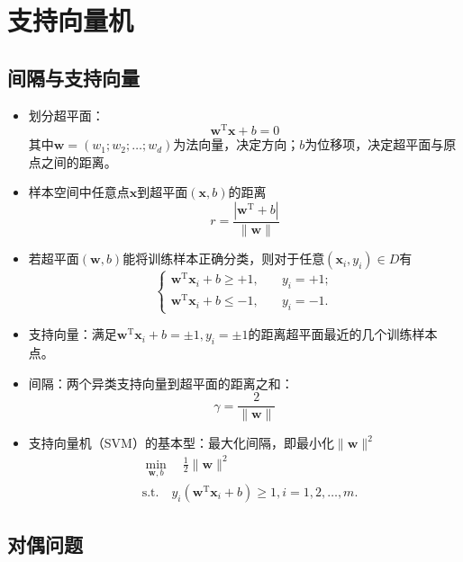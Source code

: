 \documentclass{ctexart}
\begin{document}
			\section{支持向量机}
				\subsection{间隔与支持向量}
					\begin{itemize}
						\item 划分超平面：\[\bm{w}^{\mathrm{T}}\bm{x}+b=0\]其中$\bm{w}=(w_1;w_2;\dots;w_d)$为法向量，决定方向；$b$为位移项，决定超平面与原点之间的距离。
						\item 样本空间中任意点$\bm{x}$到超平面$(\bm{x},b)$的距离\[r=\frac{|\bm{w}^{\mathrm{T}}+b|}{\parallel\bm{w}\parallel}\]
						\item 若超平面$(\bm{w},b)$能将训练样本正确分类，则对于任意$(\bm{x}_i,y_i)\in D$有\[\left\{\begin{aligned}
							\bm{w}^{\mathrm{T}}\bm{x}_i+b\ge+1, & \quad y_i=+1;\\
							\bm{w}^{\mathrm{T}}\bm{x}_i+b\le-1, & \quad y_i=-1.
							\end{aligned}\right.\]
						\item 支持向量：满足$\bm{w}^{\mathrm{T}}\bm{x}_i+b=\pm1,y_i=\pm1$的距离超平面最近的几个训练样本点。
						\item 间隔：两个异类支持向量到超平面的距离之和：\[\gamma=\frac{2}{\parallel\bm{w}\parallel}\]
						\item 支持向量机（SVM）的基本型：最大化间隔，即最小化$\parallel\bm{w}\parallel^2$\begin{align*}
							& \min\limits_{\bm{w},b}\quad\frac{1}{2}\parallel\bm{w}\parallel^2\\
							& \mathrm{s.t.}\quad y_i(\bm{w}^{\mathrm{T}}\bm{x}_i+b)\ge1, i=1,2,\dots,m.
						\end{align*}
					\end{itemize}
				\subsection{对偶问题}
					
\end{document}
